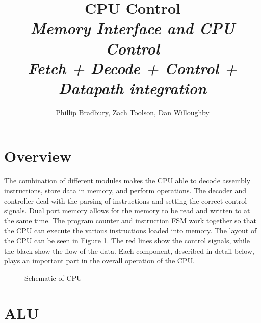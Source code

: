 \documentclass[11pt]{article}
\title{\Huge \textbf{CPU Control} \\ \normalsize \it{Memory Interface and CPU Control \\ Fetch + Decode + Control + Datapath integration}}
\author{Phillip Bradbury, Zach Toolson, Dan Willoughby}
\begin{document}
\maketitle
\clearpage

\tableofcontents
\clearpage

\section{Overview}
The combination of different modules makes the CPU able to decode assembly instructions, store data in memory, and perform operations. The decoder and controller deal with the parsing of instructions and setting the correct control signals. Dual port memory allows for the memory to be read and written to at the same time. The program counter and instruction FSM work together so that the CPU can execute the various instructions loaded into memory. The layout of the CPU can be seen in Figure \ref{fig:schematic}. The red lines show the control signals, while the black show the flow of the data. Each component, described in detail below, plays an important part in the overall operation of the CPU. 
\begin{center}
\begin{figure}
\caption{Schematic of CPU}
\label{fig:schematic}
\end{figure} 
\end{center}
\section{ALU}
\end{document}
